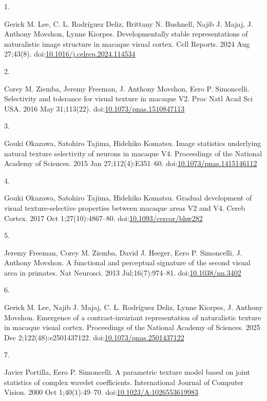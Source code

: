 \documentclass[
  11pt,
  letterpaper,
  DIV=11,
  numbers=noendperiod]{scrartcl}
\newlength{\cslhangindent}
\newlength{\csllabelwidth}
\newenvironment{CSLReferences}[2] %
 {\begin{list}{}{%
  \setlength{\itemindent}{0pt}
  \setlength{\leftmargin}{0pt}
  \setlength{\parsep}{0pt}
  \ifodd #1
   \setlength{\leftmargin}{\cslhangindent}
   \setlength{\itemindent}{-1\cslhangindent}
  \fi
  \setlength{\itemsep}{#2\baselineskip}}}
 {\end{list}}
\newcommand{\CSLLeftMargin}[1]{\parbox[t]{\csllabelwidth}{\strut#1\strut}}
\newcommand{\CSLRightInline}[1]{\parbox[t]{\linewidth - \csllabelwidth}{\strut#1\strut}}
\begin{document}
\label{refs}
\begin{CSLReferences}{0}{1}
\CSLLeftMargin{1. }%
\CSLRightInline{Gerick M. Lee, C. L. Rodríguez Deliz, Brittany N.
Bushnell, Najib J. Majaj, J. Anthony Movshon, Lynne Kiorpes.
Developmentally stable representations of naturalistic image structure
in macaque visual cortex. Cell Reports. 2024 Aug 27;43(8).
doi:\href{https://doi.org/10.1016/j.celrep.2024.114534}{10.1016/j.celrep.2024.114534}}

\CSLLeftMargin{2. }%
\CSLRightInline{Corey M. Ziemba, Jeremy Freeman, J. Anthony Movshon,
Eero P. Simoncelli. Selectivity and tolerance for visual texture in
macaque V2. Proc Natl Acad Sci USA. 2016 May 31;113(22).
doi:\href{https://doi.org/10.1073/pnas.1510847113}{10.1073/pnas.1510847113}}

\CSLLeftMargin{3. }%
\CSLRightInline{Gouki Okazawa, Satohiro Tajima, Hidehiko Komatsu. Image
statistics underlying natural texture selectivity of neurons in macaque
V4. Proceedings of the National Academy of Sciences. 2015 Jan
27;112(4):E351--60.
doi:\href{https://doi.org/10.1073/pnas.1415146112}{10.1073/pnas.1415146112}}

\CSLLeftMargin{4. }%
\CSLRightInline{Gouki Okazawa, Satohiro Tajima, Hidehiko Komatsu.
Gradual development of visual texture-selective properties between
macaque areas V2 and V4. Cereb Cortex. 2017 Oct 1;27(10):4867--80.
doi:\href{https://doi.org/10.1093/cercor/bhw282}{10.1093/cercor/bhw282}}

\CSLLeftMargin{5. }%
\CSLRightInline{Jeremy Freeman, Corey M. Ziemba, David J. Heeger, Eero
P. Simoncelli, J. Anthony Movshon. A functional and perceptual signature
of the second visual area in primates. Nat Neurosci. 2013
Jul;16(7):974--81.
doi:\href{https://doi.org/10.1038/nn.3402}{10.1038/nn.3402}}

\CSLLeftMargin{6. }%
\CSLRightInline{Gerick M. Lee, Najib J. Majaj, C. L. Rodríguez Deliz,
Lynne Kiorpes, J. Anthony Movshon. Emergence of a contrast-invariant
representation of naturalistic texture in macaque visual cortex.
Proceedings of the National Academy of Sciences. 2025 Dec
2;122(48):e2501437122.
doi:\href{https://doi.org/10.1073/pnas.2501437122}{10.1073/pnas.2501437122}}

\CSLLeftMargin{7. }%
\CSLRightInline{Javier Portilla, Eero P. Simoncelli. A parametric
texture model based on joint statistics of complex wavelet coefficients.
International Journal of Computer Vision. 2000 Oct 1;40(1):49--70.
doi:\href{https://doi.org/10.1023/A:1026553619983}{10.1023/A:1026553619983}}

\end{CSLReferences}
\end{document}
